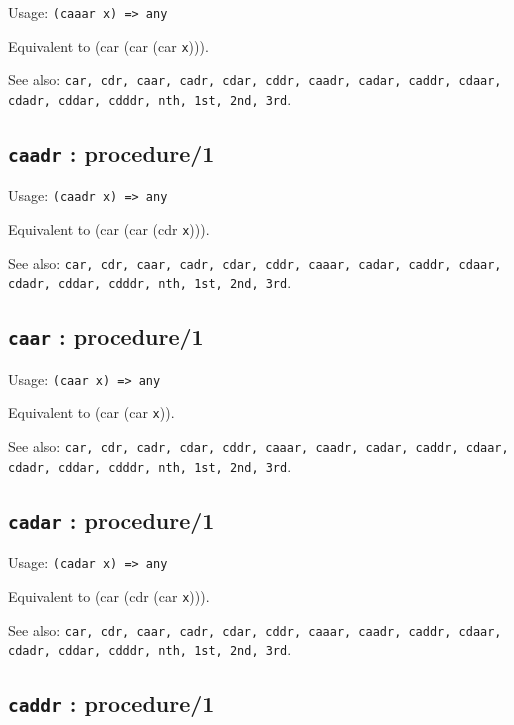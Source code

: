 \documentclass[
]{article}
\newcommand{\passthrough}[1]{#1}
\begin{document}
Usage: \passthrough{\lstinline!(caaar x) => any!}

Equivalent to (car (car (car \passthrough{\lstinline!x!}))).

See also:
\passthrough{\lstinline!car, cdr, caar, cadr, cdar, cddr, caadr, cadar, caddr, cdaar, cdadr, cddar, cdddr, nth, 1st, 2nd, 3rd!}.

\hypertarget{caadr-procedure1-1}{%
\subsection{\texorpdfstring{\texttt{caadr} :
procedure/1}{caadr : procedure/1}}\label{caadr-procedure1-1}}

Usage: \passthrough{\lstinline!(caadr x) => any!}

Equivalent to (car (car (cdr \passthrough{\lstinline!x!}))).

See also:
\passthrough{\lstinline!car, cdr, caar, cadr, cdar, cddr, caaar, cadar, caddr, cdaar, cdadr, cddar, cdddr, nth, 1st, 2nd, 3rd!}.

\hypertarget{caar-procedure1-1}{%
\subsection{\texorpdfstring{\texttt{caar} :
procedure/1}{caar : procedure/1}}\label{caar-procedure1-1}}

Usage: \passthrough{\lstinline!(caar x) => any!}

Equivalent to (car (car \passthrough{\lstinline!x!})).

See also:
\passthrough{\lstinline!car, cdr, cadr, cdar, cddr, caaar, caadr, cadar, caddr, cdaar, cdadr, cddar, cdddr, nth, 1st, 2nd, 3rd!}.

\hypertarget{cadar-procedure1-1}{%
\subsection{\texorpdfstring{\texttt{cadar} :
procedure/1}{cadar : procedure/1}}\label{cadar-procedure1-1}}

Usage: \passthrough{\lstinline!(cadar x) => any!}

Equivalent to (car (cdr (car \passthrough{\lstinline!x!}))).

See also:
\passthrough{\lstinline!car, cdr, caar, cadr, cdar, cddr, caaar, caadr, caddr, cdaar, cdadr, cddar, cdddr, nth, 1st, 2nd, 3rd!}.

\hypertarget{caddr-procedure1-1}{%
\subsection{\texorpdfstring{\texttt{caddr} :
procedure/1}{caddr : procedure/1}}\label{caddr-procedure1-1}}
\end{document}
